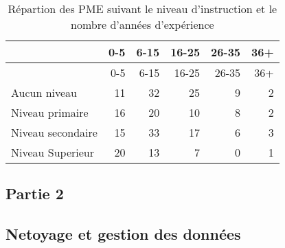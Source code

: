\documentclass[
]{article}
\newenvironment{Shaded}{\begin{snugshade}}{\end{snugshade}}
\newcommand{\AttributeTok}[1]{\textcolor[rgb]{0.77,0.63,0.00}{#1}}
\newcommand{\ConstantTok}[1]{\textcolor[rgb]{0.00,0.00,0.00}{#1}}
\newcommand{\DecValTok}[1]{\textcolor[rgb]{0.00,0.00,0.81}{#1}}
\newcommand{\FunctionTok}[1]{\textcolor[rgb]{0.00,0.00,0.00}{#1}}
\newcommand{\NormalTok}[1]{#1}
\newcommand{\OtherTok}[1]{\textcolor[rgb]{0.56,0.35,0.01}{#1}}
\newcommand{\SpecialCharTok}[1]{\textcolor[rgb]{0.00,0.00,0.00}{#1}}
\newcommand{\StringTok}[1]{\textcolor[rgb]{0.31,0.60,0.02}{#1}}
\begin{document}
\begin{Shaded}
\end{Shaded}

\begin{longtable}[]{@{}lrrrrr@{}}
\caption{Répartion des PME suivant le niveau d'instruction et le nombre
d'années d'expérience}\tabularnewline
\toprule()
& 0-5 & 6-15 & 16-25 & 26-35 & 36+ \\
\midrule()
\endfirsthead
\toprule()
& 0-5 & 6-15 & 16-25 & 26-35 & 36+ \\
\midrule()
\endhead
Aucun niveau & 11 & 32 & 25 & 9 & 2 \\
Niveau primaire & 16 & 20 & 10 & 8 & 2 \\
Niveau secondaire & 15 & 33 & 17 & 6 & 3 \\
Niveau Superieur & 20 & 13 & 7 & 0 & 1 \\
\bottomrule()
\end{longtable}

\hypertarget{partie-2}{%
\subsection{Partie 2}\label{partie-2}}

\hypertarget{netoyage-et-gestion-des-donnuxe9es}{%
\subsection{Netoyage et gestion des
données}\label{netoyage-et-gestion-des-donnuxe9es}}
\end{document}
